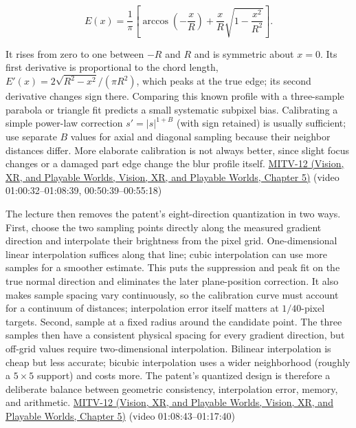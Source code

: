 \[
E(x)=\frac{1}{\pi}\left[\arccos\left(-\frac{x}{R}\right)+\frac{x}{R}\sqrt{1-\frac{x^2}{R^2}}\right].
\]

It rises from zero to one between \(-R\) and \(R\) and is symmetric about \(x=0\). Its first derivative is proportional to the chord length, \(E'(x)=2\sqrt{R^2-x^2}/(\pi R^2)\), which peaks at the true edge; its second derivative changes sign there. Comparing this known profile with a three-sample parabola or triangle fit predicts a small systematic subpixel bias. Calibrating a simple power-law correction \(s'=|s|^{1+B}\) (with sign retained) is usually sufficient; use separate \(B\) values for axial and diagonal sampling because their neighbor distances differ. More elaborate calibration is not always better, since slight focus changes or a damaged part edge change the blur profile itself. \href{../07-Vision-XR-and-Playable-Worlds/main.pdf\#nameddest=04-visual-computing-ii-ch036-mitv-12---blob-analysis-binary-image-processing-greens-theorem-derivative-and-integral}{MITV-12 (Vision, XR, and Playable Worlds, Vision, XR, and Playable Worlds, Chapter 5)} (video 01:00:32--01:08:39, 00:50:39--00:55:18)

The lecture then removes the patent's eight-direction quantization in two ways. First, choose the two sampling points directly along the measured gradient direction and interpolate their brightness from the pixel grid. One-dimensional linear interpolation suffices along that line; cubic interpolation can use more samples for a smoother estimate. This puts the suppression and peak fit on the true normal direction and eliminates the later plane-position correction. It also makes sample spacing vary continuously, so the calibration curve must account for a continuum of distances; interpolation error itself matters at \(1/40\)-pixel targets. Second, sample at a fixed radius around the candidate point. The three samples then have a consistent physical spacing for every gradient direction, but off-grid values require two-dimensional interpolation. Bilinear interpolation is cheap but less accurate; bicubic interpolation uses a wider neighborhood (roughly a \(5\times5\) support) and costs more. The patent's quantized design is therefore a deliberate balance between geometric consistency, interpolation error, memory, and arithmetic. \href{../07-Vision-XR-and-Playable-Worlds/main.pdf\#nameddest=04-visual-computing-ii-ch036-mitv-12---blob-analysis-binary-image-processing-greens-theorem-derivative-and-integral}{MITV-12 (Vision, XR, and Playable Worlds, Vision, XR, and Playable Worlds, Chapter 5)} (video 01:08:43--01:17:40)

